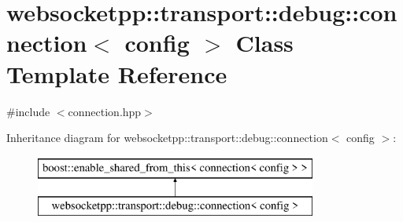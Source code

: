\hypertarget{classwebsocketpp_1_1transport_1_1debug_1_1connection}{}\section{websocketpp\+:\+:transport\+:\+:debug\+:\+:connection$<$ config $>$ Class Template Reference}
\label{classwebsocketpp_1_1transport_1_1debug_1_1connection}


{\ttfamily \#include $<$connection.\+hpp$>$}

Inheritance diagram for websocketpp\+:\+:transport\+:\+:debug\+:\+:connection$<$ config $>$\+:\begin{figure}[H]
\begin{center}
\leavevmode
\includegraphics[height=2.000000cm]{classwebsocketpp_1_1transport_1_1debug_1_1connection}
\end{center}
\end{figure}
